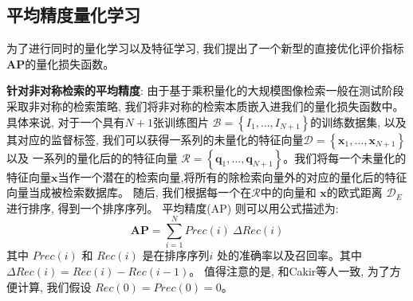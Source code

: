 \subsection{平均精度量化学习}
为了进行同时的量化学习以及特征学习, 我们提出了一个新型的直接优化评价指标\textbf{AP}的量化损失函数。 \par
\textbf{针对非对称检索的平均精度}: 由于基于乘积量化的大规模图像检索一般在测试阶段采取非对称的检索策略, 我们将非对称的检索本质嵌入进我们的量化损失函数中。具体来说, 对于一个具有$N+1$张训练图片 $\mathcal{B}=\left\{I_{1}, \ldots, I_{N+1}\right\}$的训练数据集, 以及其对应的监督标签, 我们可以获得一系列的未量化的特征向量$\mathcal{D} = \left\{ \mathbf{x}_{1}, \ldots, \mathbf{x}_{N+1} \right\}$以及
一系列的量化后的的特征向量 $\mathcal{R} = \left\{ \mathbf{q}_1, \ldots, \mathbf{q}_{N+1} \right \}$。我们将每一个未量化的特征向量$\mathbf{x}$当作一个潜在的检索向量,将所有的除检索向量外的对应的量化后的特征向量当成被检索数据库。 随后, 我们根据每一个在$\mathcal{R}$中的向量和 $\mathbf{x}$的欧式距离
$\mathcal{D}_E$ 进行排序, 得到一个排序序列。 平均精度(AP) 则可以用公式描述为:
\begin{equation}
    \mathbf{AP}=\sum_{i=1}^{N} Prec(i) \ \Delta Rec(i)
    \end{equation}
其中 $Prec(i)$ 和 $Rec(i)$ 是在排序序列$i$ 处的准确率以及召回率。其中$\Delta Rec(i) = Rec(i) - Rec(i-1)$。 值得注意的是,  和Cakir等人一致, 为了方便计算, 我们假设 $Rec(0) = Prec(0) =  0$。

